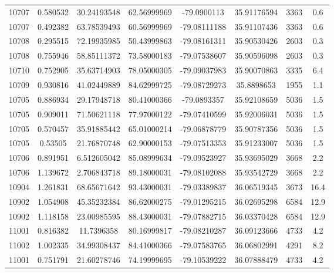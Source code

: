 \documentclass[11pt]{article}
\begin{document}
\begin{longtable*}{|c|c|c|c|c|c|c|c|}
10707 & 0.580532       & 30.24193548       & 62.56999969    & -79.0900113  & 35.91176594 & 3363       & 0.6  \\
10707 & 0.492382       & 63.78539493       & 60.56999969    & -79.08111188 & 35.91107436 & 3363       & 0.6  \\
10708 & 0.295515       & 72.19935985       & 50.43999863    & -79.08161311 & 35.90530426 & 2603       & 0.3  \\
10708 & 0.755946       & 58.85111372       & 73.58000183    & -79.07538607 & 35.90596098 & 2603       & 0.3  \\
10710 & 0.752905       & 35.63714903       & 78.05000305    & -79.09037983 & 35.90070863 & 3335       & 6.4  \\
10709 & 0.930816       & 41.02449889       & 84.62999725    & -79.08729273 & 35.8898653  & 1955       & 1.1  \\
10705 & 0.886934       & 29.17948718       & 80.41000366    & -79.0893357  & 35.92108659 & 5036       & 1.5  \\
10705 & 0.909011       & 71.50621118       & 77.97000122    & -79.07410599 & 35.92006031 & 5036       & 1.5  \\
10705 & 0.570457       & 35.91885442       & 65.01000214    & -79.06878779 & 35.90787356 & 5036       & 1.5  \\
10705 & 0.53505        & 21.76870748       & 62.90000153    & -79.07513353 & 35.91233007 & 5036       & 1.5  \\
10706 & 0.891951       & 6.512605042       & 85.08999634    & -79.09523927 & 35.93695029 & 3668       & 2.2  \\
10706 & 1.139672       & 2.706843718       & 89.18000031    & -79.08102088 & 35.93542729 & 3668       & 2.2  \\
10904 & 1.261831       & 68.65671642       & 93.43000031    & -79.03389837 & 36.06519345 & 3673       & 16.4 \\
10902 & 1.054908       & 45.35232384       & 86.62000275    & -79.01295215 & 36.02695298 & 6584       & 12.9 \\
10902 & 1.118158       & 23.00985595       & 88.43000031    & -79.07882715 & 36.03370428 & 6584       & 12.9 \\
11001 & 0.816382       & 11.7396358        & 80.16999817    & -79.08210287 & 36.09123666 & 4733       & 4.2  \\
11002 & 1.002335       & 34.99308437       & 84.41000366    & -79.07583765 & 36.06802991 & 4291       & 8.2  \\
11001 & 0.751791       & 21.60278746       & 74.19999695    & -79.10539222 & 36.07888479 & 4733       & 4.2  \\

\end{longtable*}
\end{document}
